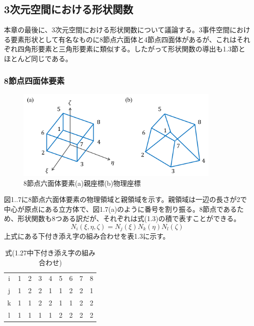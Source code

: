 \documentclass[dvipdfmx, 9pt, a4paper]{jsarticle}
\numberwithin{equation}{section}
\begin{document}
\subsection{3次元空間における形状関数}
本章の最後に、3次元空間における形状関数について議論する。3事件空間における要素形状として有名なものに8節点六面体と4節点四面体があるが、これはそれぞれ四角形要素と三角形要素に類似する。したがって形状関数の導出も1.3節とほとんど同じである。

\subsubsection{8節点四面体要素}
\begin{figure}[t]
\begin{center}
\includegraphics[width = 10cm]{fig1_7.png}
\caption{8節点六面体要素(a)親座標(b)物理座標}
\end{center}
\end{figure}
図1..7に8節点六面体要素の物理領域と親領域を示す。親領域は一辺の長さが2で中心が原点にある立方体で、図1.7(a)のように番号を割り振る。8節点であるため、形状関数も8つある訳だが、それぞれは式(1.3)の積で表すことができる。
\begin{equation}
N_i(\xi, \eta, \zeta)=N_j(\xi)N_k(\eta)N_l(\zeta)
\end{equation}
上式にある下付き添え字の組み合わせを表1.3に示す。\par

\begin{table}[t]
\begin{center}
\caption{式(1.27中下付き添え字の組み合わせ)}
\begin{tabular}{c|cccccccc}
\hline
i & 1 & 2 & 3 & 4 & 5 & 6 & 7 & 8 \\
j & 1 & 2 & 2 & 1 & 1 & 2 & 2 & 1 \\
k & 1 & 1 & 2 & 2 & 1 & 1 & 2 & 2 \\
l & 1 & 1 & 1 & 1 & 2 & 2 & 2 & 2 \\ \hline
\end{tabular}
\end{center}
\end{table}
\end{document}
